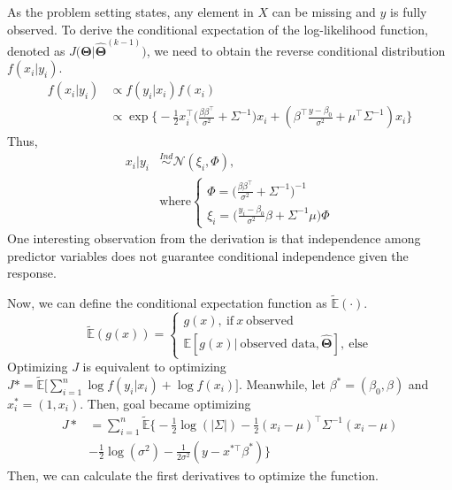 \documentclass[
  twocolumn]{article}
\begin{document}
As the problem setting states, any element in \(X\) can be missing and
\(y\) is fully observed. To derive the conditional expectation of the
log-likelihood function, denoted as
\(J\big(\boldsymbol{\Theta}|\boldsymbol{\hat{\Theta}}^{(k-1)}\big)\), we
need to obtain the reverse conditional distribution \(f(x_i|y_i)\). \[
\begin{aligned}
f(x_i|y_i) &\propto f(y_i|x_i) f(x_i) \\
&\propto \exp\Big\{ -\frac{1}{2}x_{i}^{\top}\big( \frac{\beta\beta^{\top}}{\sigma^2} + \Sigma^{-1} \big)x_i+
(\beta^{\top} \frac{y-\beta_0}{\sigma^2} + \mu^{\top}\Sigma^{-1})x_i\Big\}
\end{aligned}
\] Thus, \[
\begin{aligned}
x_i | y_i &\overset{Ind}{\sim} \mathcal{N}(\xi_i, \Phi), \\
&\text{where}
\begin{cases}
    \Phi = \big( \frac{\beta\beta^{\top}}{\sigma^2} + \Sigma^{-1} \big)^{-1} \\
    \xi_i = \big( \frac{y_i-\beta_0}{\sigma^2}\beta + \Sigma^{-1}\mu \big)\Phi
\end{cases}
\end{aligned}
\] One interesting observation from the derivation is that independence
among predictor variables does not guarantee conditional independence
given the response.

Now, we can define the conditional expectation function as
\(\tilde{\mathbb{E}}(\cdot)\). \[
\tilde{\mathbb{E}}(g(x)) = 
\begin{cases}
    g(x), ~\text{if}~x~\text{observed} \\
    \mathbb{E}[g(x) |~\text{observed data}, \boldsymbol{\hat\Theta}], ~\text{else}
\end{cases}
\] Optimizing \(J\) is equivalent to optimizing
\(J* = \tilde{\mathbb{E}}\big[\sum_{i=1}^{n} \log f(y_i|x_i) + \log f(x_i)\big]\).
Meanwhile, let \(\beta^{*} = (\beta_0, \beta)\) and
\(x_i^{*} = (1, x_i)\). Then, goal became optimizing \[
\begin{aligned}
J* &= \sum_{i = 1}^{n}\tilde{\mathbb{E}}\Big\{ -\frac{1}{2} \log(|\Sigma|) - \frac{1}{2} (x_i - \mu)^{\top}\Sigma^{-1}(x_i - \mu) \\
&- \frac{1}{2}\log(\sigma^2) - \frac{1}{2\sigma^2}(y - x^{*\top}\beta^{*})\Big\}
\end{aligned}
\] Then, we can calculate the first derivatives to optimize the
function.
\end{document}
